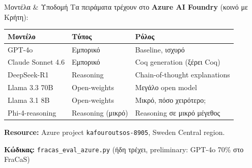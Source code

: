 \documentclass[aspectratio=169,10pt]{beamer}
\begin{document}
\begin{frame}{Μοντέλα \& Υποδομή}
	Τα πειράματα τρέχουν στο \textbf{Azure AI Foundry} (κοινό με Κρήτη):

	\vspace{0.3cm}
	\begin{center}
		\small
		\begin{tabular}{l l l}
			\toprule
			\textbf{Μοντέλο} & \textbf{Τύπος} & \textbf{Ρόλος} \\
			\midrule
			GPT-4o & Εμπορικό & Baseline, ισχυρό \\
			Claude Sonnet 4.6 & Εμπορικό & Coq generation (ξέρει Coq) \\
			DeepSeek-R1 & Reasoning & Chain-of-thought explanations \\
			Llama 3.3 70B & Open-weights & Μεγάλο open model \\
			Llama 3.1 8B & Open-weights & Μικρό, πόσο χειρότερο; \\
			Phi-4-reasoning & Reasoning (μικρό) & Reasoning σε μικρό μέγεθος \\
			\bottomrule
		\end{tabular}
	\end{center}

	\vspace{0.3cm}
	\textbf{Resource:} Azure project \texttt{kafouroutsos-8905}, Sweden Central region.

	\vspace{0.2cm}
	\textbf{Κώδικας:} \texttt{fracas\_eval\_azure.py} (ήδη τρέχει, preliminary: GPT-4o 70\% στο FraCaS)
\end{frame}
\end{document}
